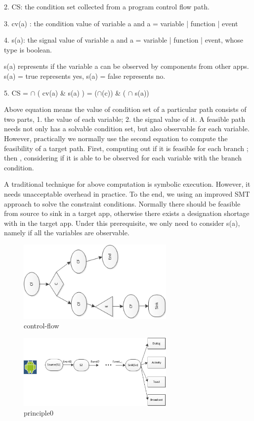\documentclass{sig-alternate-05-2015}
\begin{document}
2. CS: the condition set collected from a program control flow path.

3. cv(a) : the condition value of variable a and a = variable | function | event

4. s(a): the signal value of variable a and a = variable | function | event, whose type is boolean.

s(a) represents if the variable a can be observed by components from other apps. s(a) = true represents yes, s(a) = false represents no.

5. CS = $\cap$ ( cv(a) \& s(a) ) = ($\cap$(c)) \& ( $\cap$ s(a))

Above equation means the value of condition set of a particular path consists of two parts, 1. the value of each variable; 2. the signal value of it.  A feasible path needs not only has a solvable condition set, but also observable for each variable. However, practically we normally use the second equation to compute the feasibility of a target path. First, computing out if it is feasible for each branch ; then , considering if it is able to be observed for each variable with the branch condition.

A traditional technique for above computation is symbolic execution. However, it needs unacceptable overhead in practice. {\color {red} To the end, we using an improved SMT approach to solve the constraint conditions.} Normally there should be feasible from source to sink in a target app, otherwise there exists a designation shortage with in the target app. Under this prerequisite, we only need to consider s(a), namely if all the variables are observable. 



\begin{figure}[t]
\centering
\includegraphics[width = 3.0in]{control-flow.png}
\caption{\label{}control-flow}
\end{figure}



\begin{figure}
\centering
\includegraphics[width = 3.0in]{principle0.png}
\caption{\label{} principle0}
\end{figure}
\end{document}
